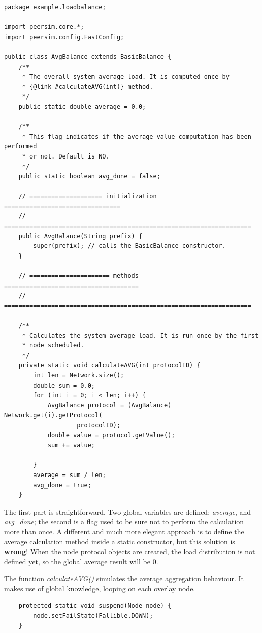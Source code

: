 \documentclass[a4paper,11pt]{article}
\begin{document}
\footnotesize
\begin{verbatim}
package example.loadbalance;

import peersim.core.*;
import peersim.config.FastConfig;

public class AvgBalance extends BasicBalance {
    /**
     * The overall system average load. It is computed once by
     * {@link #calculateAVG(int)} method.
     */
    public static double average = 0.0;

    /**
     * This flag indicates if the average value computation has been performed
     * or not. Default is NO.
     */
    public static boolean avg_done = false;

    // ==================== initialization ================================
    // ====================================================================
    public AvgBalance(String prefix) {
        super(prefix); // calls the BasicBalance constructor.
    }

    // ====================== methods =====================================
    // ====================================================================

    /**
     * Calculates the system average load. It is run once by the first
     * node scheduled. 
     */
    private static void calculateAVG(int protocolID) {
        int len = Network.size();
        double sum = 0.0;
        for (int i = 0; i < len; i++) {
            AvgBalance protocol = (AvgBalance) Network.get(i).getProtocol(
                    protocolID);
            double value = protocol.getValue();
            sum += value;

        }
        average = sum / len;
        avg_done = true;
    }
\end{verbatim}
\normalsize


The first part is straightforward. Two global variables are defined:
\emph{average}, and \emph{avg\_done}; the second is a flag used to be
sure not to
perform the calculation more than once. A different and much more
elegant approach is to define the average calculation method inside
a static constructor, but this solution is \textbf{wrong}! When the
node protocol objects are created, the load distribution is not defined
yet, so the global average result will be 0.

The function \emph{calculateAVG()} simulates the average aggregation
behaviour. It makes use of global knowledge, looping on each overlay
node. 

\footnotesize
\begin{verbatim}
    protected static void suspend(Node node) {
        node.setFailState(Fallible.DOWN);
    }
\end{verbatim}
\normalsize
\end{document}
